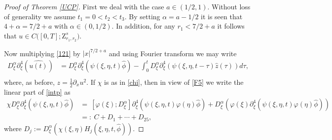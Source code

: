 \documentclass[reqno]{amsart}
\newcommand{\ha}{\hat{\phi}}
\newcommand{\va}{\varphi}
\newcommand{\p}{\partial}
\numberwithin{equation}{section}
\begin{document}
\begin{proof}[Proof of Theorem \ref{UCP}]
First we deal with the case $a\in (1/2,1)$. Without loss of generality  we assume $t_1=0<t_2<t_3.$  By setting $\alpha=a-1/2$ it is seen that $4+\alpha=7/2+a$ with $\alpha\in (0,1/2)$. In addition, for any $r_1<7/2+a$ it follows that $u\in C \big([0,T];\mathrm{Z}^{s}_{r_1,r_2}\big)$.

Now multiplying \eqref{121} by $|x|^{7/2+a}$ and using Fourier transform  we may write
\begin{equation}
\begin{split}\label{intp}  
D_\xi^\alpha \p_\xi^4(\widehat{u(t)})&=D_\xi^\alpha \p_\xi^4(\psi(\xi,\eta,t)\ha)-\int_0^t D_\xi^\alpha \p_\xi^4(\psi(\xi,\eta,t-\tau)\hat{z}(\tau))d\tau,\\
\end{split}
\end{equation}
where, as before, $z=\frac12\partial_{x}u^{2}$. If $\chi$ is as in \eqref{chi}, then in view of \eqref{F5} we write the linear part of \eqref{intp} as
\begin{equation}
\begin{split}\label{chiD}
\chi D_{\xi}^{\alpha}\partial_{\xi}^4(\psi(\xi,\eta, t)\hat{\phi})&=\ [\va(\xi);D_{\xi}^{\alpha}]\partial_{\xi}^4(\psi(\xi,\eta,t) \va(\eta)\hat{\phi})+D_\xi^{\alpha}(\va(\xi) \p_\xi^4 (\psi(\xi,\eta, t) \va(\eta)\hat{\phi}))\\
&=:\ C+D_1+\cdots +D_{25},
\end{split}
\end{equation}
where $D_j:=D^\alpha_\xi(\chi(\xi,\eta) H_j(\xi,\eta,t,\hat{\phi}))$.



\end{proof}
\end{document}
